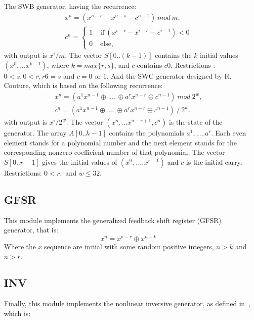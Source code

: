 The SWB generator, having the recurrence:
\begin{equation}
\label{SWB}
\begin{array}{l}
x^n = (x^{n-r} - x^{n-s} - c^{n-1})~mod~m, \\
c^n=\left\{
\begin{array}{l}
1 ~~~~~\text{if}~ (x^{i-r} - x^{i-s} - c^{i-1})<0\\
0 ~~~~~\text{else},\end{array} \right. \end{array}\end{equation}
with output is $x^i/m$. The vector $S[0..(k-1)]$ contains
the $k$ initial values $(x^0,... x^{k-1})$, where $k = max\{r, s\}$, and $c$ contains $c0$. Restrictions : $0 < s,0 < r, r 6= s$ and $c = 0$ or $1$.
And the SWC generator designed by R. Couture, which is based on the following recurrence:
\begin{equation}
\label{SWC}
\begin{array}{l}
x^n = (a^1x^{n-1} \oplus ~...~ \oplus a^rx^{n-r} \oplus c^{n-1}) ~ mod ~ 2^w, \\
c^n = (a^1x^{n-1} \oplus ~...~ \oplus a^rx^{n-r} \oplus c^{n-1}) ~ / ~ 2^w. \end{array}\end{equation}
with output is $x^i/2^w$. The vector $(x^n,...x^{n-r+1}, c^n)$ is the state of the generator. The array $A[0..h-1]$ contains the polynomials $a^1,...,a^r$. Each even element stands for a polynomial number and the next
element stands for the corresponding nonzero coefficient number of that polynomial. The vector
$S[0..r-1]$ gives the initial values of $(x^0,...,x^{r-1})$ and $c$ is the initial carry. Restrictions: $0 < r,$
and $w \leq 32$.

\subsection{GFSR}
This module implements the generalized feedback shift register (GFSR) generator, that is:
\begin{equation}
x^n = x^{n-r} \oplus x^{n-k}
\label{GFSR}
\end{equation}
Where the $x$ sequence are initial with some random positive integers, $n>k$ and $n>r$.

\subsection{INV}
Finally, this module implements the nonlinear inversive generator, as defined in~\cite{Lecuyer2009}, which is:

